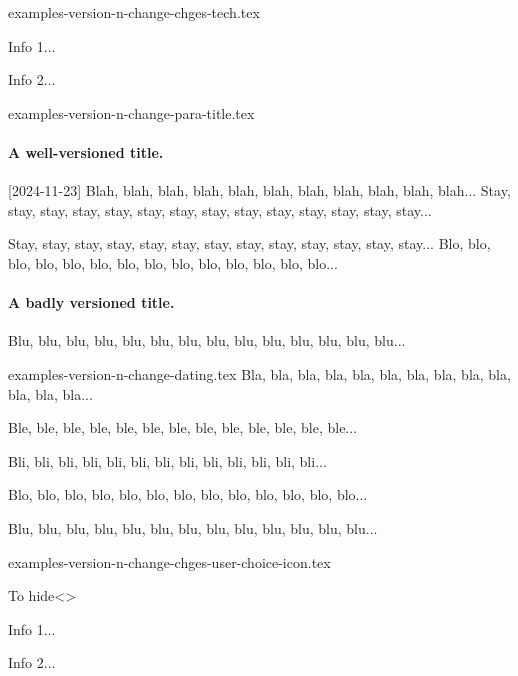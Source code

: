 \begin{filecontents*}[overwrite]{examples-version-n-change-chges-tech.tex}
\begin{tdoctech}
    \item Info 1...
    \item Info 2...
\end{tdoctech}
\end{filecontents*}


\begin{filecontents*}[overwrite]{examples-version-n-change-para-title.tex}
\paragraph{A well-versioned title.}
[2024-11-23]
Blah, blah, blah, blah, blah, blah, blah, blah, blah, blah, blah...
Stay, stay, stay, stay, stay, stay, stay, stay, stay, stay, stay, stay, stay, stay...

Stay, stay, stay, stay, stay, stay, stay, stay, stay, stay, stay, stay, stay...
Blo, blo, blo, blo, blo, blo, blo, blo, blo, blo, blo, blo, blo, blo...

\paragraph{A badly versioned title.}
Blu, blu, blu, blu, blu, blu, blu, blu, blu, blu, blu, blu, blu, blu...
\end{filecontents*}


\begin{filecontents*}[overwrite]{examples-version-n-change-dating.tex}
Bla, bla, bla, bla, bla, bla, bla, bla, bla, bla, bla, bla, bla...

\medskip %

Ble, ble, ble, ble, ble, ble, ble, ble, ble, ble, ble, ble, ble...

\medskip %

Bli, bli, bli, bli, bli, bli, bli, bli, bli, bli, bli, bli, bli...

Blo, blo, blo, blo, blo, blo, blo, blo, blo, blo, blo, blo, blo...

Blu, blu, blu, blu, blu, blu, blu, blu, blu, blu, blu, blu, blu...
\end{filecontents*}


\begin{filecontents*}[overwrite]{examples-version-n-change-chges-user-choice-icon.tex}
\begin{tdoctopic}{To hide}<\faEyeSlash>
    \item Info 1...
    \item Info 2...
\end{tdoctopic}
\end{filecontents*}


